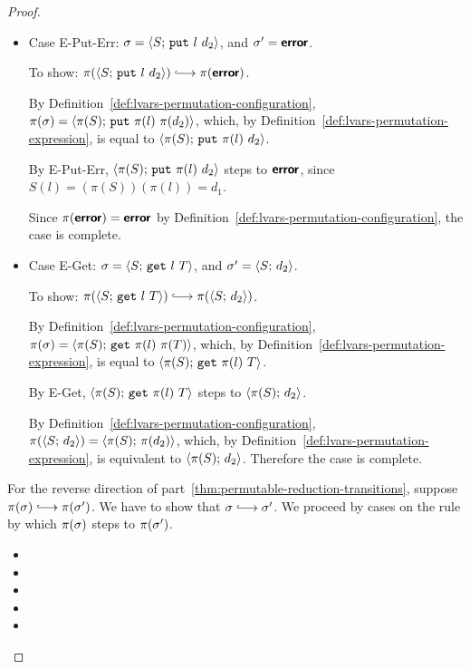 \begin{proof}
\begin{itemize}
    \item Case {\sc E-Put-Err}: $\sigma = \langle S;\, \mbox{\texttt{put}}~l~d_2 \rangle$,
      and $\sigma' = \textbf{\textsf{error}}$.

      To show: $\pi(\config{S}{\putexp{l}{d_2}}) \parstepsto
      \pi(\error)$.

      By Definition~\ref{def:lvars-permutation-configuration},
      $\pi(\sigma) = \langle \pi(S);\, \mbox{\texttt{put}}~\pi(l)~\pi(d_2) \rangle$,
      which, by Definition~\ref{def:lvars-permutation-expression}, is
      equal to $\langle \pi(S);\, \mbox{\texttt{put}}~\pi(l)~d_2 \rangle$.

      By {\sc E-Put-Err}, $\langle \pi(S);\, \mbox{\texttt{put}}~\pi(l)~d_2 \rangle$
      steps to $\textbf{\textsf{error}}$, since $S(l) = (\pi(S))(\pi(l)) = d_1$.

      Since $\pi(\textbf{\textsf{error}}) = \textbf{\textsf{error}}$ by
      Definition~\ref{def:lvars-permutation-configuration}, the case
      is complete.

    \item Case {\sc E-Get}: $\sigma = \langle S;\, \mbox{\texttt{get}}~l~T \rangle$, and
      $\sigma' = \langle S;\, d_2 \rangle$.

      To show: $\pi(\config{S}{\getexp{l}{T}}) \parstepsto
      \pi(\config{S}{d_2})$.

      By Definition~\ref{def:lvars-permutation-configuration},
      $\pi(\sigma) = \langle \pi(S);\, \mbox{\texttt{get}}~\pi(l)~\pi(T) \rangle$,
      which, by Definition~\ref{def:lvars-permutation-expression}, is
      equal to $\langle \pi(S);\, \mbox{\texttt{get}}~\pi(l)~T \rangle$.

      By {\sc E-Get}, $\langle \pi(S);\, \mbox{\texttt{get}}~\pi(l)~T \rangle$
      steps to $\langle \pi(S);\, d_2 \rangle$.

      By Definition~\ref{def:lvars-permutation-configuration},
      $\pi(\langle S;\, d_2 \rangle) = \langle \pi(S);\, \pi(d_2) \rangle$, which, by
      Definition~\ref{def:lvars-permutation-expression}, is equivalent
      to $\langle \pi(S);\, d_2 \rangle$.  Therefore the case is complete.
  \end{itemize}

  For the reverse direction of
  part~\ref{thm:permutable-reduction-transitions}, suppose $\pi(\conf)
  \parstepsto \pi(\conf')$.  We have to show that $\conf \parstepsto
  \conf'$.  We proceed by cases on the rule by which $\pi(\sigma)$
  steps to $\pi(\sigma')$.

  \begin{itemize}
    \item {}
    \item {}
    \item {}
    \item {}
    \item {}
  \end{itemize}


\end{proof}
